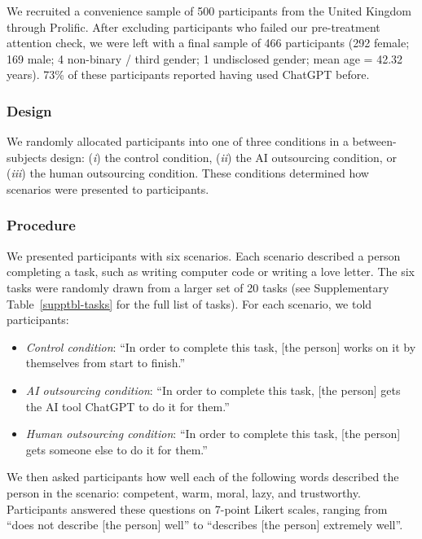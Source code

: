 \documentclass[
  man,
  floatsintext,
  longtable,
  nolmodern,
  notxfonts,
  notimes,
  colorlinks=true,linkcolor=blue,citecolor=blue,urlcolor=blue]{apa7}
\providecommand{\tightlist}{%
  \setlength{\itemsep}{0pt}\setlength{\parskip}{0pt}}
\begin{document}
We recruited a convenience sample of 500 participants from the United
Kingdom through Prolific. After excluding participants who failed our
pre-treatment attention check, we were left with a final sample of 466
participants (292 female; 169 male; 4 non-binary / third gender; 1
undisclosed gender; mean age = 42.32 years). 73\% of these participants
reported having used ChatGPT before.

\subsubsection*{Design}\label{design-5}

We randomly allocated participants into one of three conditions in a
between-subjects design: (\emph{i}) the control condition, (\emph{ii})
the AI outsourcing condition, or (\emph{iii}) the human outsourcing
condition. These conditions determined how scenarios were presented to
participants.

\subsubsection*{Procedure}\label{procedure-6}

We presented participants with six scenarios. Each scenario described a
person completing a task, such as writing computer code or writing a
love letter. The six tasks were randomly drawn from a larger set of 20
tasks (see Supplementary Table~\ref{supptbl-tasks} for the full list of
tasks). For each scenario, we told participants:

\begin{itemize}
\tightlist
\item
  \emph{Control condition}: ``In order to complete this task, {[}the
  person{]} works on it by themselves from start to finish.''
\item
  \emph{AI outsourcing condition}: ``In order to complete this task,
  {[}the person{]} gets the AI tool ChatGPT to do it for them.''
\item
  \emph{Human outsourcing condition}: ``In order to complete this task,
  {[}the person{]} gets someone else to do it for them.''
\end{itemize}

We then asked participants how well each of the following words
described the person in the scenario: competent, warm, moral, lazy, and
trustworthy. Participants answered these questions on 7-point Likert
scales, ranging from ``does not describe {[}the person{]} well'' to
``describes {[}the person{]} extremely well''.
\end{document}
